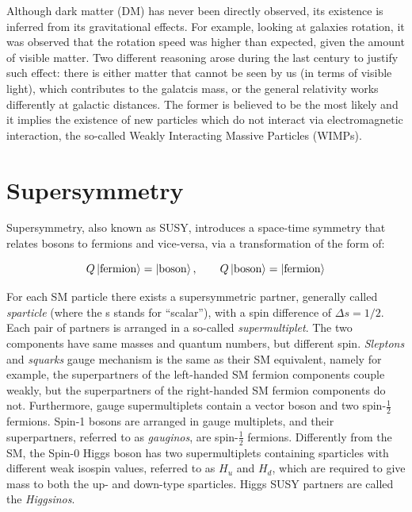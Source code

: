 			Although dark matter (DM) has never been directly observed, its existence is inferred from its gravitational effects. For example, looking at galaxies rotation, it was observed that the rotation speed was higher than expected, given the amount of visible matter. Two different reasoning arose during the last century to justify such effect: there is either matter that cannot be seen by us (in terms of visible light), which contributes to the galatcis mass, or the general relativity works differently at galactic distances. The former is believed to be the most likely and it implies the existence of new particles which do not interact via electromagnetic interaction, the so-called Weakly Interacting Massive Particles (WIMPs).







	\section{Supersymmetry}
	\label{sec:SUSY}
		
		Supersymmetry, also known as SUSY, introduces a space-time symmetry that relates bosons to fermions and vice-versa, via a transformation of the form of:  

		\begin{equation}
		\label{eq:susy_transformation}
			Q \ket{\mathrm{fermion}} = \ket{\mathrm{boson}}, \qquad Q \ket{\mathrm{boson}} = \ket{\mathrm{fermion}}
		\end{equation}

		\noindent For each SM particle there exists a supersymmetric partner, generally called \textit{sparticle} (where the s stands for “scalar”), with a spin difference of $\Delta s = 1/2$. Each pair of partners is arranged in a so-called \textit{supermultiplet}. The two components have same masses and quantum numbers, but different spin. \textit{Sleptons} and \textit{squarks} gauge mechanism is the same as their SM equivalent, namely for example, the superpartners of the left-handed SM fermion components couple weakly, but the superpartners of the right-handed SM fermion components do not. Furthermore, gauge supermultiplets contain a vector boson and two spin-$\frac{1}{2}$ fermions. Spin-1 bosons are arranged in gauge multiplets, and their superpartners, referred to as \textit{gauginos}, are spin-$\frac{1}{2}$ fermions. Differently from the SM, the Spin-0 Higgs boson has two supermultiplets containing sparticles with different weak isospin values, referred to as $H_u$ and $H_d$, which are required to give mass to both the up- and down-type sparticles. Higgs SUSY partners are called the \textit{Higgsinos}.

